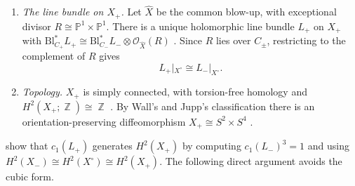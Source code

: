 \documentclass{article}
\DeclareMathOperator{\Z}{\mathbb{Z}}
\theoremstyle{definition}
\theoremstyle{plain}
\newcommand{\PP}{\mathbb{P}}
\newcommand{\cO}{\mathcal{O}}
\begin{document}
\begin{enumerate}
  \cite[Def.~3.2]{LLZ26}. Put $X^\circ=X_-\setminus C_-=X_+\setminus C_+$.
\item \emph{The line bundle on $X_+$.} Let $\widehat X$ be the common blow-up, with
  exceptional divisor $R\cong\PP^1\times\PP^1$. There is a unique holomorphic line bundle
  $L_+$ on $X_+$ with
  $\mathrm{Bl}_{C_+}^*L_+\cong\mathrm{Bl}_{C_-}^*L_-\otimes\cO_{\widehat X}(R)$
  \cite[(6)]{LLZ26}. Since $R$ lies over $C_\pm$, restricting to the complement of $R$ gives
  \begin{equation}\label{eq:LU}
  L_+|_{X^\circ}\cong L_-|_{X^\circ}.
  \end{equation}
\item \emph{Topology.} $X_+$ is simply connected, with torsion-free homology and
  $H^2(X_+;\Z)\cong\Z$ \cite[Prop.~3.5]{LLZ26}. By Wall's and Jupp's classification
  \cite{Wall66,Jupp73} there is an orientation-preserving diffeomorphism
  $X_+\cong S^2\times S^4$ \cite[Thm.~1.2 and \S5.2]{LLZ26}.
\end{enumerate}

\cite{LLZ26} show that $c_1(L_+)$ generates $H^2(X_+)$ by computing
$c_1(L_-)^3=1$ \cite[Lemma 4.1]{LLZ26} and using
$H^2(X_-)\cong H^2(X^\circ)\cong H^2(X_+)$. The following direct argument avoids the cubic
form.
\end{document}
